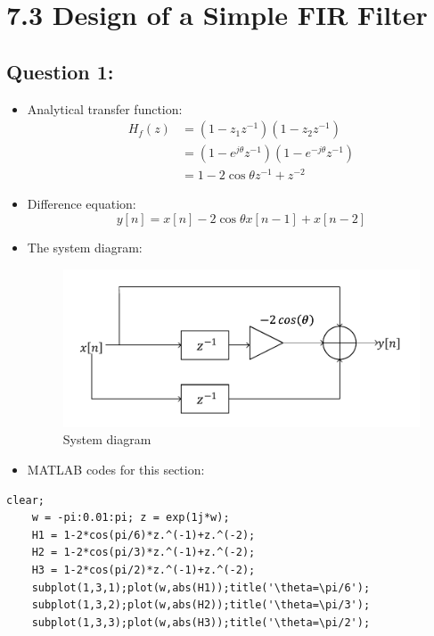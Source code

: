 \documentclass[onecolumn,oneside]{SUSTechHomework}
\begin{document}
\section*{7.3 Design of a Simple FIR Filter}
\subsection*{Question 1:}
\begin{itemize}
	\item Analytical transfer function:
	$$
	\begin{aligned}
	H_{f}(z)&=\left(1-z_{1} z^{-1}\right)\left(1-z_{2} z^{-1}\right)
	\\&=\left(1-e^{j \theta} z^{-1}\right)\left(1-e^{-j \theta} z^{-1}\right)
	\\&=1-2 \cos \theta z^{-1}+z^{-2}
	\end{aligned}
	$$
	\item Difference equation:
	$$
	y[n]=x[n]-2 \cos \theta x[n-1]+x[n-2]
	$$
	\item The system diagram:
	\begin{figure}[H]
		\centering
		\includegraphics[width=150mm]{pictures/框图1.pdf}
		\caption{System diagram}
	\end{figure}
	\item MATLAB codes for this section:
\end{itemize}
\begin{lstlisting}[title=q7\_3a.m]
	clear;
	w = -pi:0.01:pi; z = exp(1j*w);
	H1 = 1-2*cos(pi/6)*z.^(-1)+z.^(-2);
	H2 = 1-2*cos(pi/3)*z.^(-1)+z.^(-2);
	H3 = 1-2*cos(pi/2)*z.^(-1)+z.^(-2);
	subplot(1,3,1);plot(w,abs(H1));title('\theta=\pi/6');
	subplot(1,3,2);plot(w,abs(H2));title('\theta=\pi/3');
	subplot(1,3,3);plot(w,abs(H3));title('\theta=\pi/2');
\end{lstlisting}
\end{document}
